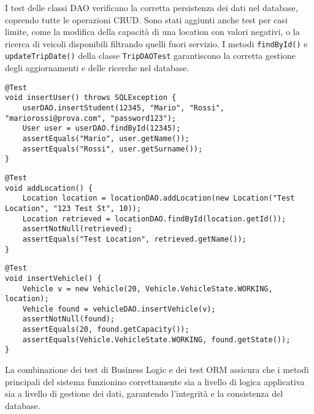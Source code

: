 \noindent I test delle classi DAO verificano la corretta persistenza dei dati nel database, coprendo tutte le operazioni CRUD. Sono stati aggiunti anche test per casi limite, come la modifica della capacità di una location con valori negativi, o la ricerca di veicoli disponibili filtrando quelli fuori servizio. I metodi \texttt{findById()} e \texttt{updateTripDate()} della classe \texttt{TripDAOTest} garantiscono la corretta gestione degli aggiornamenti e delle ricerche nel database.

\begin{lstlisting}[style=java, caption={Inserimento di un utente in UserDAOTest}]
@Test
void insertUser() throws SQLException {
    userDAO.insertStudent(12345, "Mario", "Rossi", "mariorossi@prova.com", "password123");
    User user = userDAO.findById(12345);
    assertEquals("Mario", user.getName());
    assertEquals("Rossi", user.getSurname());
}
\end{lstlisting}

\begin{lstlisting}[style=java, caption={Aggiunta di una location in LocationDAOTest}]
@Test
void addLocation() {
    Location location = locationDAO.addLocation(new Location("Test Location", "123 Test St", 10));
    Location retrieved = locationDAO.findById(location.getId());
    assertNotNull(retrieved);
    assertEquals("Test Location", retrieved.getName());
}
\end{lstlisting}

\begin{lstlisting}[style=java, caption={Inserimento di un veicolo in VehicleDAOTest}]
@Test
void insertVehicle() {
    Vehicle v = new Vehicle(20, Vehicle.VehicleState.WORKING, location);
    Vehicle found = vehicleDAO.insertVehicle(v);
    assertNotNull(found);
    assertEquals(20, found.getCapacity());
    assertEquals(Vehicle.VehicleState.WORKING, found.getState());
}
\end{lstlisting}

\noindent La combinazione dei test di Business Logic e dei test ORM assicura che i metodi principali del sistema funzionino correttamente sia a livello di logica applicativa sia a livello di gestione dei dati, garantendo l’integrità e la consistenza del database.  

